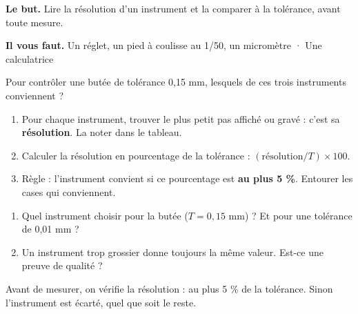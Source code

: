 \documentclass[10pt,a4paper]{article}
\begin{document}
\thispagestyle{fancy}
\begin{tcolorbox}[boite]\textbf{Le but.} Lire la résolution d'un instrument et la comparer à la tolérance, avant toute mesure.\par\textbf{Il vous faut.} Un réglet, un pied à coulisse au 1/50, un micromètre · Une calculatrice\end{tcolorbox}
\begin{tcolorbox}[pred]Pour contrôler une butée de tolérance 0,15 mm, lesquels de ces trois instruments conviennent ?\reponse\end{tcolorbox}
\begin{enumerate}[label=\textcolor{cyan}{\textbf{\arabic*.}},leftmargin=15pt,itemsep=1.5pt]
\item Pour chaque instrument, trouver le plus petit pas affiché ou gravé : c'est sa \textbf{résolution}. La noter dans le tableau.
\item Calculer la résolution en pourcentage de la tolérance : $(\text{résolution} / T) \times 100$.
\item Règle : l'instrument convient si ce pourcentage est \textbf{au plus 5 \%}. Entourer les cases qui conviennent.
\end{enumerate}
\par
{}
\begin{enumerate}[label=\textcolor{cyan}{\textbf{Q\arabic*.}},leftmargin=22pt]
\item Quel instrument choisir pour la butée ($T = 0{,}15$ mm) ? Et pour une tolérance de 0,01 mm ?\reponse[2]
\item Un instrument trop grossier donne toujours la même valeur. Est-ce une preuve de qualité ?\reponse[2]
\end{enumerate}
\begin{tcolorbox}[retenir]Avant de mesurer, on vérifie la résolution : au plus 5 \% de la tolérance. Sinon l'instrument est écarté, quel que soit le reste.\end{tcolorbox}
\end{document}
